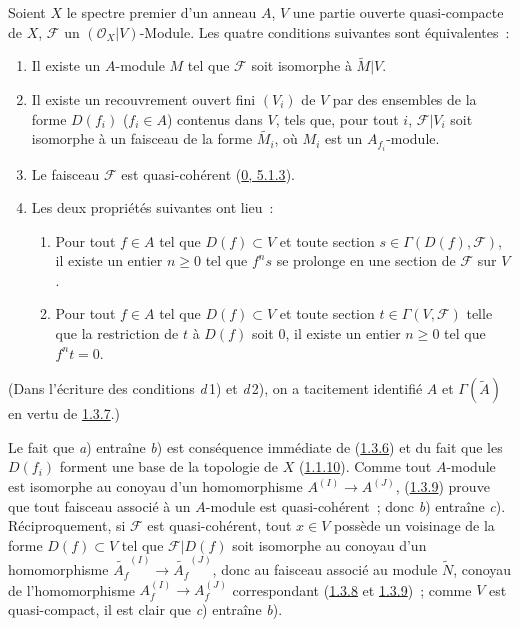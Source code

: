\begin{theorem}[1.4.1]
\label{I.1.4.1-fr}
Soient $X$ le spectre premier d'un anneau $A$, $V$ une partie ouverte
quasi-compacte de $X$, $\mathscr{F}$ un $(\mathscr{O}_X|V)$-Module. Les
quatre conditions suivantes sont équivalentes~:
\begin{enumerate}
  \item[\textit{a})] Il existe un $A$-module $M$ tel que $\mathscr{F}$ soit
  isomorphe à $\widetilde{M}|V$.
  \item[\textit{b})] Il existe un recouvrement ouvert fini $(V_i)$ de $V$ par des
  ensembles de la forme $D(f_i)$ ($f_i\in A$) contenus dans $V$, tels que,
  pour tout $i$, $\mathscr{F}|V_i$ soit isomorphe à un faisceau de la forme
  $\widetilde{M_i}$, où $M_i$ est un $A_{f_i}$-module.
  \item[\textit{c})] Le faisceau $\mathscr{F}$ est quasi-cohérent
  (\hyperref[0.5.1.3-fr]{0, 5.1.3}).
  \item[\textit{d})] Les deux propriétés suivantes ont lieu~:
  \begin{enumerate}
    \item[\textit{d}\,1)] Pour tout $f\in A$ tel que $D(f)\subset V$ et toute
    section $s\in\Gamma(D(f),\mathscr{F})$, il existe un entier $n\geq0$ tel
    que $f^n s$ se prolonge en une section de $\mathscr{F}$ sur $V$.
    \item[\textit{d}\,2)] Pour tout $f\in A$ tel que $D(f)\subset V$ et toute
    section $t\in\Gamma(V,\mathscr{F})$ telle que la restriction de $t$ à
    $D(f)$ soit $0$, il existe un entier $n\geq0$ tel que $f^n t=0$.
  \end{enumerate}
\end{enumerate}
\end{theorem}

(Dans l'écriture des conditions \textit{d}\,1) et \textit{d}\,2), on a tacitement identifié $A$
et $\Gamma(\widetilde{A})$ en vertu de
\hyperref[I.1.3.7-fr]{1.3.7}.)

Le fait que \textit{a}) entraîne \textit{b}) est conséquence immédiate de
(\hyperref[I.1.3.6-fr]{1.3.6}) et du fait que les $D(f_i)$ forment une base
de la topologie de $X$ (\hyperref[I.1.1.10-fr]{1.1.10}). Comme tout
$A$-module est isomorphe au conoyau d'un homomorphisme
$A^{(I)}\to A^{(J)}$, (\hyperref[I.1.3.9-fr]{1.3.9}) prouve que tout faisceau
associé à un $A$-module est quasi-cohérent~; donc \textit{b}) entraîne \textit{c}).
Réciproquement, si $\mathscr{F}$ est quasi-cohérent, tout $x\in V$ possède
un voisinage de la forme $D(f)\subset V$ tel que $\mathscr{F}|D(f)$ soit
isomorphe au conoyau d'un homomorphisme
$\widetilde{A_f}^{(I)}\to\widetilde{A_f}^{(J)}$, donc au faisceau associé au
module $\widetilde{N}$, conoyau de l'homomorphisme
$A_f^{(I)}\to A_f^{(J)}$ correspondant
(\hyperref[I.1.3.8-fr]{1.3.8} et \hyperref[I.1.3.9-fr]{1.3.9})~; comme $V$
est quasi-compact, il est clair que \textit{c}) entraîne \textit{b}).
